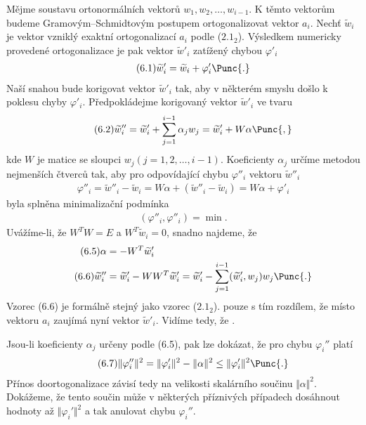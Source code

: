 Mějme soustavu ortonormálních vektorů $w_1,w_2,\dots,w_{i-1}$. K těmto
vektorům budeme Gra\-mo\-vým--Schmidtovým postupem ortogonalizovat
vektor $a_i$.  Nechť $\widetilde w_i$ je vektor vzniklý exaktní
ortogonalizací $a_i$ podle ($2.1_2$).  Výsledkem numericky
provedené ortogonalizace je pak vektor $\widetilde w'_i$ zatížený
chybou $\varphi'_i$
%
\begin{align*}
  \tag{6.1}
  {\widetilde w}'_i = \widetilde w_i + \varphi'_i \Punc{.}
\end{align*}
%
Naší snahou bude korigovat vektor $\widetilde w'_i$ tak, aby v
některém smyslu došlo k poklesu chyby $\varphi'_i.$ Předpokládejme
korigovaný vektor $\widetilde w'_i$ ve tvaru
%
\begin{align*}
  \tag{6.2}
  \widetilde w''_i = \widetilde w'_i
  + \sum_{j=1}^{i-1} \alpha_jw_j = \widetilde w'_i + W\alpha
  \Punc{,}
\end{align*}
%
kde $W$ je matice se sloupci $w_j (j=1,2,\dots,i-1)$.  Koeficienty
$\alpha_j$ určíme metodou nejmenších čtverců tak, aby pro odpovídající
chybu $\varphi''_i$ vektoru $\widetilde w''_i$
%
\begin{align*}
  \tag{6.3}
  \varphi''_i = \widetilde w''_i - \widetilde w_i =
  W\alpha + (\widetilde w''_i - \widetilde w_i)  =
  W\alpha + \varphi'_i
\end{align*}
%
byla splněna minimalizační podmínka
%
\begin{align*}
  \tag{6.4}
  (\varphi''_i,\varphi''_i) = \min.
\end{align*}
%
Uvážíme-li, že $W^TW = E$ a $W^T\widetilde w_i = 0$, snadno najdeme,
že
%
\begin{align*}
  \tag{6.5}
  \alpha &= -W^T\widetilde w'_i \\
  \tag{6.6}
  \widetilde w''_i &= \widetilde w'_i - WW^T\widetilde w'_i =
  \widetilde w'_i -
  \sum_{j=1}^{i-1}(\widetilde w'_i,w_j)w_j \Punc{.}
\end{align*}
%
Vzorec (6.6) je formálně stejný jako vzorec ($2.1_2$). pouze s tím
rozdílem, že místo vektoru $a_i$ zaujímá nyní vektor $\widetilde
w'_i$. Vidíme tedy, že .


Jsou-li koeficienty $\alpha_j$ určeny podle (6.5), pak lze dokázat,
že pro chybu $\varphi_i''$ platí
%
\begin{align*}
  \tag{6.7}
  \Vert\varphi_i''\Vert^2 =
  \Vert\varphi_i'\Vert^2 - \Vert\alpha\Vert^2 \le \Vert\varphi_i'\Vert^2 \Punc{.}
\end{align*}
%
Přínos  doortogonalizace závisí tedy na velikosti skalárního
součinu $\Vert\alpha\Vert^2$. Dokážeme, že tento součin může v některých
příznivých případech dosáhnout hodnoty až $\Vert\varphi_i'\Vert^2$ a tak
anulovat chybu $\varphi_i''$.


